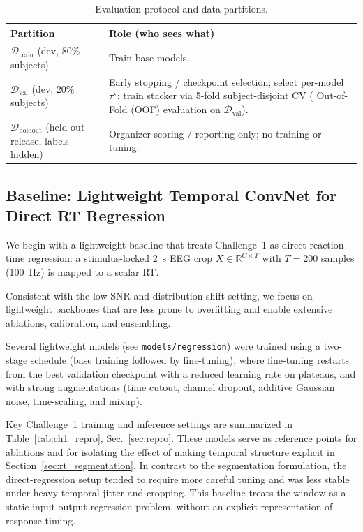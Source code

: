 \documentclass[12pt]{article}
\begin{document}
\begin{table}[h]
\centering
\small
\setlength{\tabcolsep}{6pt}
\renewcommand{\arraystretch}{1.15}
\begin{tabularx}{\linewidth}{@{} l X @{}}
\toprule
\textbf{Partition} & \textbf{Role (who sees what)} \\
\midrule
$\mathcal{D}_{\text{train}}$ (dev, 80\% subjects) &
Train base models. \\
$\mathcal{D}_{\text{val}}$ (dev, 20\% subjects) &
Early stopping / checkpoint selection; select per-model $\tau^\star$; train stacker via 5-fold subject-disjoint CV
( Out-of-Fold (OOF) evaluation on $\mathcal{D}_{\text{val}}$). \\
$\mathcal{D}_{\text{holdout}}$ (held-out release, labels hidden) &
Organizer scoring / reporting only; no training or tuning. \\
\bottomrule
\end{tabularx}
\caption{Evaluation protocol and data partitions.}
\label{tab:protocol}
\end{table}

\subsection{Baseline: Lightweight Temporal ConvNet for Direct RT Regression}

\label{sec:baseline_regression}

We begin with a lightweight baseline that treats Challenge~1 as direct reaction-time regression: a stimulus-locked 2~s EEG crop $X \in \mathbb{R}^{C \times T}$ with $T=200$ samples (100~Hz) is mapped to a scalar RT. 

Consistent with the low-SNR and distribution shift setting, we focus on lightweight backbones that are less prone to overfitting and enable extensive ablations, calibration, and ensembling.

Several lightweight models (see \texttt{models/regression}) were trained using a two-stage schedule (base training followed by fine-tuning), where
fine-tuning restarts from the best validation checkpoint with a reduced learning rate on plateaus, and with strong
augmentations (time cutout, channel dropout, additive Gaussian noise, time-scaling, and mixup). 

Key Challenge~1 training and inference settings are summarized in Table~\ref{tab:ch1_repro}, Sec.~\ref{sec:repro}. These models serve as reference points for ablations and for isolating the effect of making temporal structure explicit in Section~\ref{sec:rt_segmentation}. In contrast to the segmentation formulation, the direct-regression setup tended to require more careful tuning and was less stable under heavy temporal jitter and cropping. This baseline treats the window as a static input-output regression problem, without an explicit representation of response timing.
\end{document}
